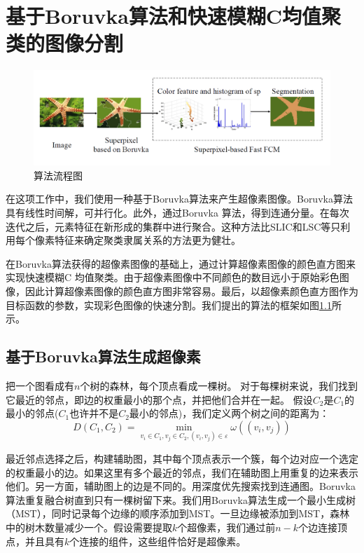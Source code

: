
\chapter{基于Boruvka算法和快速模糊C均值聚类的图像分割}

\begin{figure}[h]
\begin{center}
\includegraphics[width=1\textwidth]{figures/FCM2.png}
\end{center}
\vspace{-5mm}
\caption{算法流程图}
\label{fig4.1}
\end{figure}

在这项工作中，我们使用一种基于Boruvka算法来产生超像素图像。Boruvka算法具有线性时间解，可并行化。此外，通过Boruvka 算法，得到连通分量。在每次迭代之后，元素特征在新形成的集群中进行聚合。这种方法比SLIC和LSC等只利用每个像素特征来确定聚类隶属关系的方法更为健壮。

在Boruvka算法获得的超像素图像的基础上，通过计算超像素图像的颜色直方图来实现快速模糊C 均值聚类。由于超像素图像中不同颜色的数目远小于原始彩色图像，因此计算超像素图像的颜色直方图非常容易。最后，以超像素颜色直方图作为目标函数的参数，实现彩色图像的快速分割。我们提出的算法的框架如图\ref{fig4.1}所示。

\section{基于Boruvka算法生成超像素}

把一个图看成有$n$个树的森林，每个顶点看成一棵树。
对于每棵树来说，我们找到它最近的邻点，即边的权重最小的那个点，并把他们合并在一起。
假设$C_{2}$是$C_{1}$的最小的邻点($C_{1}$也许并不是$C_{2}$最小的邻点)，我们定义两个树之间的距离为：
\begin{equation}\label{eqn:hardassn}
D(C_{1},C_{2}) = \min_{v_{i}\in C_{1},v_{j}\in C_{2},(v_{i},v_{j})\in \varepsilon} \omega ((v_{i},v_{j}))
\end{equation}

最近邻点选择之后，构建辅助图，其中每个顶点表示一个簇，每个边对应一个选定的权重最小的边。如果这里有多个最近的邻点，我们在辅助图上用重复的边来表示他们。另一方面，辅助图上的边是不同的。用深度优先搜索找到连通图。Boruvka算法重复融合树直到只有一棵树留下来。我们用Boruvka算法生成一个最小生成树（MST），同时记录每个边缘的顺序添加到MST。一旦边缘被添加到MST，森林中的树木数量减少一个。假设需要提取$k$个超像素，我们通过前$n-k$个边连接顶点，并且具有$k$个连接的组件，这些组件恰好是超像素。

